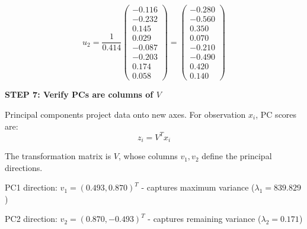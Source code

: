 \documentclass[12pt]{article}
\begin{document}
\begin{solution}
\[
u_2 = \frac{1}{0.414} \begin{pmatrix}
-0.116 \\
-0.232 \\
0.145 \\
0.029 \\
-0.087 \\
-0.203 \\
0.174 \\
0.058
\end{pmatrix} = \begin{pmatrix}
-0.280 \\
-0.560 \\
0.350 \\
0.070 \\
-0.210 \\
-0.490 \\
0.420 \\
0.140
\end{pmatrix}
\]

\textbf{STEP 7: Verify PCs are columns of $V$}

Principal components project data onto new axes. For observation $x_i$, PC scores are:
\[
z_i = V^T x_i
\]

The transformation matrix is $V$, whose columns $v_1, v_2$ define the principal directions.

PC1 direction: $v_1 = (0.493, 0.870)^T$ - captures maximum variance ($\lambda_1 = 839.829$)

PC2 direction: $v_2 = (0.870, -0.493)^T$ - captures remaining variance ($\lambda_2 = 0.171$)


\end{solution}
\end{document}
